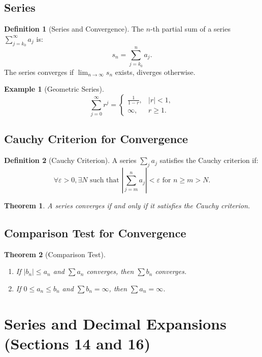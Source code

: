 \documentclass[9pt]{article}
\theoremstyle{definition}
\newtheorem{definition}{Definition}
\theoremstyle{plain}
\newtheorem{theorem}{Theorem}
\newtheorem{example}{Example}
\begin{document}
\subsection*{Series}
\begin{definition}[Series and Convergence]
The \( n \)-th partial sum of a series \( \sum_{j=k_0}^\infty a_j \) is:
\[
s_n = \sum_{j=k_0}^n a_j.
\]
The series converges if \( \lim_{n \to \infty} s_n \) exists, diverges otherwise.
\end{definition}

\begin{example}[Geometric Series]
\[
\sum_{j=0}^\infty r^j =
\begin{cases} 
\frac{1}{1-r}, & |r| < 1, \\
\infty, & r \geq 1.
\end{cases}
\]
\end{example}

\subsection*{Cauchy Criterion for Convergence}
\begin{definition}[Cauchy Criterion]
A series \( \sum_j a_j \) satisfies the Cauchy criterion if:
\[
\forall \varepsilon > 0, \exists N \text{ such that } \left| \sum_{j=m}^n a_j \right| < \varepsilon \text{ for } n \geq m > N.
\]
\end{definition}

\begin{theorem}
A series converges if and only if it satisfies the Cauchy criterion.
\end{theorem}

\subsection*{Comparison Test for Convergence}
\begin{theorem}[Comparison Test]
\leavevmode
\begin{enumerate}
    \item If \( |b_n| \leq a_n \) and \( \sum a_n \) converges, then \( \sum b_n \) converges.
    \item If \( 0 \leq a_n \leq b_n \) and \( \sum b_n = \infty \), then \( \sum a_n = \infty \).
\end{enumerate}
\end{theorem}
\section*{Series and Decimal Expansions (Sections 14 and 16)}
\end{document}

